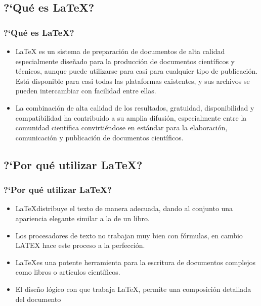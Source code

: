 \documentclass[sans serif,9pt,xcolor=dvipsnames]{beamer}%
\begin{document}
\subsection{?`Qué es  \LaTeX ?}
\begin{frame}
  \frametitle{?`Qué es  \LaTeX ?}
\begin{itemize}
\justifying
\item LaTeX es un sistema de preparación de documentos de alta calidad especialmente diseñado para la producción de documentos científicos y técnicos, aunque puede utilizarse para casi para cualquier tipo de publicación. Está disponible para casi todas las plataformas existentes, y sus archivos se pueden intercambiar con facilidad entre ellas. 
\bigskip
\item La combinación de alta calidad de los resultados, gratuidad, disponibilidad y compatibilidad ha contribuido a su amplia difusión,  especialmente entre la comunidad científica convirtiéndose en estándar para la elaboración, comunicación y publicación de documentos científicos.
\end{itemize}
\end{frame}

\subsection{?`Por qué utilizar \LaTeX ?}
\begin{frame}
  \frametitle{?`Por qué utilizar \LaTeX ?}
\begin{itemize}
\justifying
\item \LaTeX  distribuye  el texto de manera adecuada, dando al conjunto una apariencia elegante similar a la de un libro.\pause
\item Los procesadores de texto no trabajan muy bien con fórmulas, en cambio LATEX hace este proceso a la perfección.\pause
\item \LaTeX es una potente herramienta para la escritura de documentos  complejos como libros o artículos científicos.\pause
\item El diseño lógico con que trabaja \LaTeX, permite una composición detallada  del documento
\end{itemize}
\end{frame}
\end{document}
